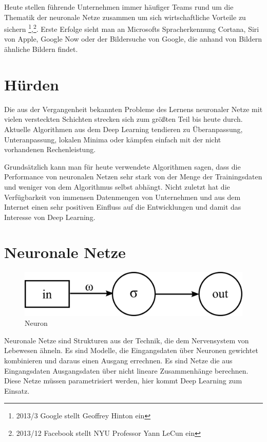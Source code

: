 Heute stellen führende Unternehmen immer häufiger Teams rund um die Thematik der neuronale Netze zusammen um sich wirtschaftliche Vorteile zu sichern \footnote{2013/3 Google stellt Geoffrey Hinton ein},\footnote{2013/12 Facebook stellt NYU Professor Yann LeCun ein}. Erste Erfolge sieht man an Microsofts Spracherkennung Cortana, Siri von Apple, Google Now oder der Bildersuche von Google, die anhand von Bildern ähnliche Bildern findet.


\section{Hürden}

Die aus der Vergangenheit bekannten Probleme des Lernens neuronaler Netze mit vielen versteckten Schichten strecken sich zum größten Teil bis heute durch. Aktuelle Algorithmen aus dem Deep Learning tendieren zu Überanpassung, Unteranpassung, lokalen Minima oder kämpfen einfach mit der nicht vorhandenen Rechenleistung.

Grundsätzlich kann man für heute verwendete Algorithmen sagen, dass die Performance von neuronalen Netzen sehr stark von der Menge der Trainingsdaten und weniger von dem Algorithmus selbst abhängt. Nicht zuletzt hat die Verfügbarkeit von immensen Datenmengen von Unternehmen und aus dem Internet einen sehr positiven Einfluss auf die Entwicklungen und damit das Interesse von Deep Learning.


\section{Neuronale Netze}

\begin{figure}
	\centering
	\includegraphics[scale=1]{images/neuron.png}
	\caption{Neuron}
	\label{fig:neuron}
\end{figure}

Neuronale Netze sind Strukturen aus der Technik, die dem Nervensystem von Lebewesen ähneln. Es sind Modelle, die Eingangsdaten über Neuronen gewichtet kombinieren und daraus einen Ausgang errechnen. Es sind Netze die aus Eingangsdaten Ausgangsdaten über nicht lineare Zusammenhänge berechnen. Diese Netze müssen parametrisiert werden, hier kommt Deep Learning zum Einsatz.

